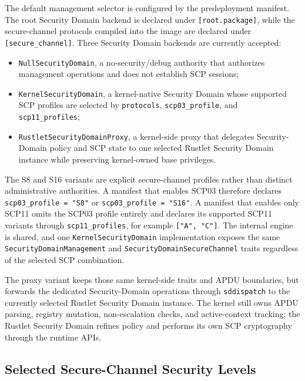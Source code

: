 The default management selector is configured by the predeployment manifest.
The root Security Domain backend is declared under \texttt{[root.package]},
while the secure-channel protocols compiled into the image are declared under
\texttt{[secure\_channel]}. Three Security Domain backends are currently
accepted:

\begin{itemize}
\item \texttt{NullSecurityDomain}, a no-security/debug authority that
      authorizes management operations and does not establish SCP sessions;
\item \texttt{KernelSecurityDomain}, a kernel-native Security Domain whose
      supported SCP profiles are selected by \texttt{protocols},
      \texttt{scp03\_profile}, and \texttt{scp11\_profiles};
\item \texttt{RustletSecurityDomainProxy}, a kernel-side proxy that delegates
      Security-Domain policy and SCP state to one selected Rustlet Security
      Domain instance while preserving kernel-owned base privileges.
\end{itemize}

The S8 and S16 variants are explicit secure-channel profiles rather than
distinct administrative authorities. A manifest that enables SCP03 therefore
declares \texttt{scp03\_profile = "S8"} or
\texttt{scp03\_profile = "S16"}. A manifest that enables only SCP11 omits the
SCP03 profile entirely and declares its supported SCP11 variants through
\texttt{scp11\_profiles}, for example \texttt{["A", "C"]}. The internal engine
is shared, and one \texttt{KernelSecurityDomain} implementation exposes the
same \texttt{SecurityDomainManagement} and
\texttt{SecurityDomainSecureChannel} traits regardless of the selected SCP
combination.

The proxy variant keeps those same kernel-side traits and APDU boundaries, but
forwards the dedicated Security-Domain operations through \texttt{sddispatch}
to the currently selected Rustlet Security Domain instance. The kernel still
owns APDU parsing, registry mutation, non-escalation checks, and active-context
tracking; the Rustlet Security Domain refines policy and performs its own SCP
cryptography through the runtime APIs.

\subsection{Selected Secure-Channel Security Levels}
\label{sec:impl-scp-selected-levels}


